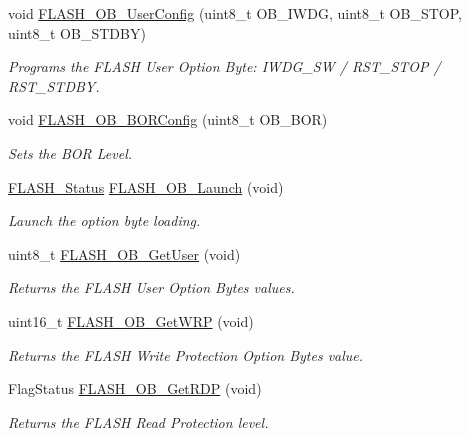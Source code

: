 \begin{DoxyCompactItemize}
void \hyperlink{group___f_l_a_s_h_ga6b605409e4271b4cc6dfb56ed8108a1a}{F\-L\-A\-S\-H\-\_\-\-O\-B\-\_\-\-User\-Config} (uint8\-\_\-t O\-B\-\_\-\-I\-W\-D\-G, uint8\-\_\-t O\-B\-\_\-\-S\-T\-O\-P, uint8\-\_\-t O\-B\-\_\-\-S\-T\-D\-B\-Y)
\begin{DoxyCompactList}\small\item\em Programs the F\-L\-A\-S\-H User Option Byte\-: I\-W\-D\-G\-\_\-\-S\-W / R\-S\-T\-\_\-\-S\-T\-O\-P / R\-S\-T\-\_\-\-S\-T\-D\-B\-Y. \end{DoxyCompactList}\item 
void \hyperlink{group___f_l_a_s_h_ga621bf052bc381c7a37fb1f8758f5ec2e}{F\-L\-A\-S\-H\-\_\-\-O\-B\-\_\-\-B\-O\-R\-Config} (uint8\-\_\-t O\-B\-\_\-\-B\-O\-R)
\begin{DoxyCompactList}\small\item\em Sets the B\-O\-R Level. \end{DoxyCompactList}\item 
\hyperlink{group___f_l_a_s_h_gadc63a6f3404ff1f71229a66915e9cdc0}{F\-L\-A\-S\-H\-\_\-\-Status} \hyperlink{group___f_l_a_s_h_gabcbd44a62a2488d8b90aa8562a258ef1}{F\-L\-A\-S\-H\-\_\-\-O\-B\-\_\-\-Launch} (void)
\begin{DoxyCompactList}\small\item\em Launch the option byte loading. \end{DoxyCompactList}\item 
uint8\-\_\-t \hyperlink{group___f_l_a_s_h_ga737dd808489113af7f8df7f7e9f7baae}{F\-L\-A\-S\-H\-\_\-\-O\-B\-\_\-\-Get\-User} (void)
\begin{DoxyCompactList}\small\item\em Returns the F\-L\-A\-S\-H User Option Bytes values. \end{DoxyCompactList}\item 
uint16\-\_\-t \hyperlink{group___f_l_a_s_h_gafa2aec5fa1ea7a73c31f3405f465c525}{F\-L\-A\-S\-H\-\_\-\-O\-B\-\_\-\-Get\-W\-R\-P} (void)
\begin{DoxyCompactList}\small\item\em Returns the F\-L\-A\-S\-H Write Protection Option Bytes value. \end{DoxyCompactList}\item 
Flag\-Status \hyperlink{group___f_l_a_s_h_ga2f0151c6c923396eaf96c554a5860c31}{F\-L\-A\-S\-H\-\_\-\-O\-B\-\_\-\-Get\-R\-D\-P} (void)
\begin{DoxyCompactList}\small\item\em Returns the F\-L\-A\-S\-H Read Protection level. \end{DoxyCompactList}\item 

\end{DoxyCompactItemize}
